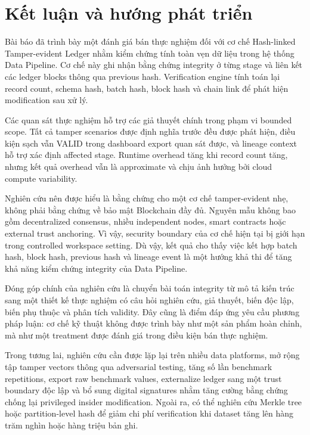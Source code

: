 \section{Kết luận và hướng phát triển}

Bài báo đã trình bày một đánh giá bán thực nghiệm đối với cơ chế Hash-linked Tamper-evident Ledger nhằm kiểm chứng tính toàn vẹn dữ liệu trong hệ thống Data Pipeline. Cơ chế này ghi nhận bằng chứng integrity ở từng stage và liên kết các ledger blocks thông qua previous hash. Verification engine tính toán lại record count, schema hash, batch hash, block hash và chain link để phát hiện modification sau xử lý.

Các quan sát thực nghiệm hỗ trợ các giả thuyết chính trong phạm vi bounded scope. Tất cả tamper scenarios được định nghĩa trước đều được phát hiện, điều kiện sạch vẫn VALID trong dashboard export quan sát được, và lineage context hỗ trợ xác định affected stage. Runtime overhead tăng khi record count tăng, nhưng kết quả overhead vẫn là approximate và chịu ảnh hưởng bởi cloud compute variability.

Nghiên cứu nên được hiểu là bằng chứng cho một cơ chế tamper-evident nhẹ, không phải bằng chứng về bảo mật Blockchain đầy đủ. Nguyên mẫu không bao gồm decentralized consensus, nhiều independent nodes, smart contracts hoặc external trust anchoring. Vì vậy, security boundary của cơ chế hiện tại bị giới hạn trong controlled workspace setting. Dù vậy, kết quả cho thấy việc kết hợp batch hash, block hash, previous hash và lineage event là một hướng khả thi để tăng khả năng kiểm chứng integrity của Data Pipeline.

Đóng góp chính của nghiên cứu là chuyển bài toán integrity từ mô tả kiến trúc sang một thiết kế thực nghiệm có câu hỏi nghiên cứu, giả thuyết, biến độc lập, biến phụ thuộc và phân tích validity. Đây cũng là điểm đáp ứng yêu cầu phương pháp luận: cơ chế kỹ thuật không được trình bày như một sản phẩm hoàn chỉnh, mà như một treatment được đánh giá trong điều kiện bán thực nghiệm.

Trong tương lai, nghiên cứu cần được lặp lại trên nhiều data platforms, mở rộng tập tamper vectors thông qua adversarial testing, tăng số lần benchmark repetitions, export raw benchmark values, externalize ledger sang một trust boundary độc lập và bổ sung digital signatures nhằm tăng cường bằng chứng chống lại privileged insider modification. Ngoài ra, có thể nghiên cứu Merkle tree hoặc partition-level hash để giảm chi phí verification khi dataset tăng lên hàng trăm nghìn hoặc hàng triệu bản ghi.

